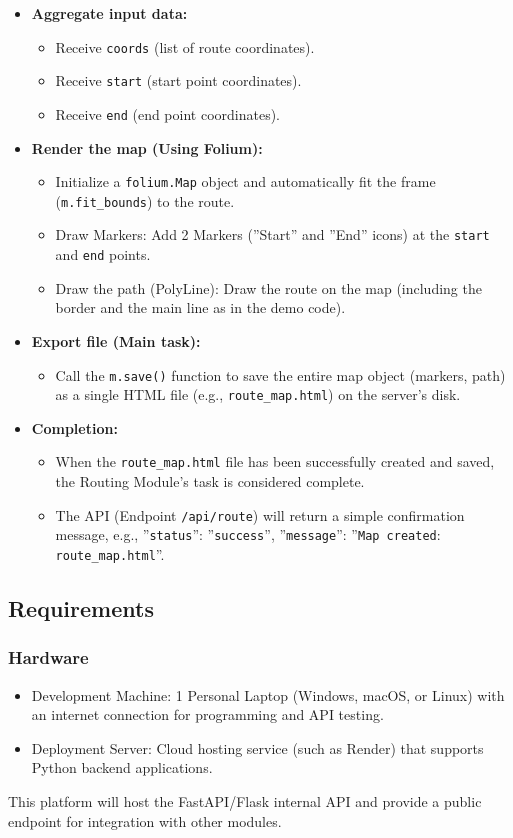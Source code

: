 \begin{itemize}
  \item \textbf{Aggregate input data:}
  \begin{itemize}
    \item Receive \texttt{coords} (list of route coordinates).
    \item Receive \texttt{start} (start point coordinates).
    \item Receive \texttt{end} (end point coordinates).
  \end{itemize}
  \item \textbf{Render the map (Using Folium):}
  \begin{itemize}
    \item Initialize a \texttt{folium.Map} object and automatically fit the frame (\texttt{m.fit\_bounds}) to the route.
    \item Draw Markers: Add 2 Markers (''Start'' and ''End'' icons) at the \texttt{start} and \texttt{end} points.
    \item Draw the path (PolyLine): Draw the route on the map (including the border and the main line as in the demo code).
  \end{itemize}
  \item \textbf{Export file (Main task):}
  \begin{itemize}
    \item Call the \texttt{m.save()} function to save the entire map object (markers, path) as a single HTML file (e.g., \texttt{route\_map.html}) on the server's disk.
  \end{itemize}
  \item \textbf{Completion:}
  \begin{itemize}
    \item When the \texttt{route\_map.html} file has been successfully created and saved, the Routing Module's task is considered complete.
    \item The API (Endpoint \texttt{/api/route}) will return a simple confirmation message, e.g., {''\texttt{status}'': ''\texttt{success}'', ''\texttt{message}'': ''\texttt{Map created}: \texttt{route\_map.html}''}.
  \end{itemize}
\end{itemize}



\subsection{Requirements}
\subsubsection{Hardware}
\begin{itemize}
    \item Development Machine: 1 Personal Laptop (Windows, macOS, or Linux) with an internet connection for programming and API testing.
    \item Deployment Server: Cloud hosting service (such as Render) that supports Python backend applications.
\end{itemize}
This platform will host the FastAPI/Flask internal API and provide a public endpoint for integration with other modules.
